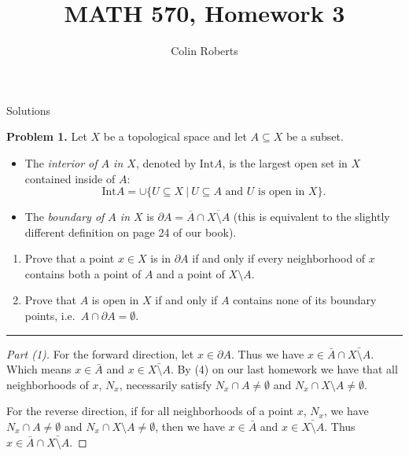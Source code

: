 \documentclass[leqno]{article}
\author{Colin Roberts}
\title{MATH 570, Homework 3}
\theoremstyle{nonumberplain}
\newtheorem{proof}{Proof}
\newcommand{\Int}{\ensuremath{\mathrm{Int}}}
\begin{document}
\maketitle
\begin{large}
\begin{center}
Solutions
\end{center}
\end{large}
\pagebreak


\noindent\textbf{Problem 1.} Let $X$ be a topological space and let $A\subseteq X$ be a subset.
\begin{itemize}
\item The \emph{interior of $A$ in $X$}, denoted by $\Int{A}$, is the largest open set in $X$ contained inside of $A$:
\[ \Int{A}=\cup\{U\subseteq X~|~U\subseteq A\mbox{ and }U\mbox{ is open in }X\}. \]
\item The \emph{boundary of $A$ in $X$} is $\partial A=\overline{A}\cap\overline{X\setminus A}$ (this is equivalent to the slightly different definition on page 24 of our book).
\end{itemize}
\begin{enumerate}
\item Prove that a point $x\in X$ is in $\partial A$ if and only if every neighborhood of $x$ contains both a point of $A$ and a point of $X\setminus A$.
\item Prove that $A$ is open in $X$ if and only if $A$ contains none of its boundary points, i.e.\ $A\cap\partial A=\emptyset$.
\end{enumerate}

\noindent\rule[0.5ex]{\linewidth}{1pt}

\begin{proof}[Part (1)]
For the forward direction, let $x\in \partial A$. Thus we have $x\in \bar{A}\cap \bar{X\setminus A}$. Which means $x\in \bar{A}$ and $x\in \bar{X\setminus A}$. By (4) on our last homework we have that all neighborhoods of $x$, $N_x$, necessarily satisfy $N_x\cap A\neq \emptyset$ and $N_x\cap X\setminus A \neq \emptyset$.

For the reverse direction, if for all neighborhoods of a point $x$, $N_x$, we have $N_x\cap A\neq \emptyset$ and $N_x\cap X\setminus A\neq \emptyset$, then we have $x\in \bar{A}$ and $x\in \bar{X\setminus A}$. Thus $x\in \bar{A}\cap \bar{X\setminus A}$.
\end{proof}
\end{document}
